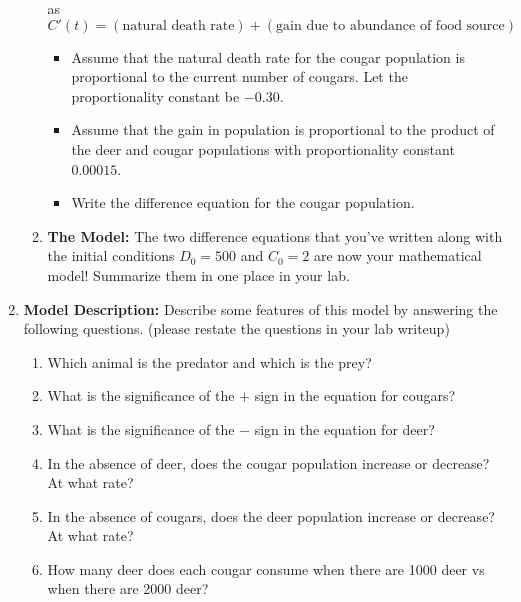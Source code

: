 \begin{problem}
\begin{enumerate}
\begin{enumerate}
                as
                \[ C'(t) = \left( \text{natural death rate} \right) + \left(
                    \text{gain due to abundance of food source}
                \right) \]
                \begin{itemize}
                    \item Assume that the natural death rate for the cougar population is
                        proportional to the current number of cougars.  Let the
                        proportionality constant be $-0.30$.
                    \item Assume that the gain in population is proportional to the
                        product of the deer and cougar populations with proportionality
                        constant $0.00015$.
                    \item Write the difference equation for the cougar population.
                \end{itemize}
            \item {\bf The Model:} The two difference equations that you've written along
                with the initial conditions $D_0 = 500$ and $C_0 = 2$ are now your
                mathematical model!  Summarize them in one place in your lab.
        \end{enumerate}
    \item {\bf Model Description:} Describe some features of this model by answering the following questions.
        (please restate the questions in your lab writeup)
        \begin{enumerate}
            \item Which animal is the predator and which is the prey? 
            \item What is the significance of the $+$ sign in the equation for cougars? 
            \item What is the significance of the $-$ sign in the equation for deer? 
            \item In the absence of deer, does the cougar population increase or decrease?
                At what rate?
            \item In the absence of cougars, does the deer population increase or
                decrease? At what rate?
            \item How many deer does each cougar consume when there are 1000 deer vs when
                there are 2000 deer?
        \end{enumerate}


\end{enumerate}
\end{problem}

